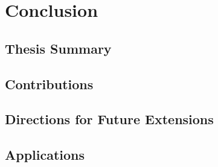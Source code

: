 \label{Chapter5}
\chapter{Conclusion}

\section{Thesis Summary}

\section{Contributions}

\section{Directions for Future Extensions}

\section{Applications}

